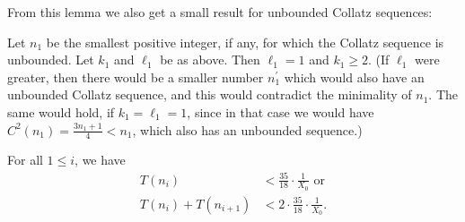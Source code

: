 \documentclass[12pt,reqno]{article}
\begin{document}
\begin{remark}
 From this lemma we also get a small result for unbounded Collatz sequences:
 
 Let $n_1$ be the smallest positive integer, if any, for which the Collatz sequence is unbounded. Let $k_1$ and $\ell_1$ be as above. Then $\ell_1=1$ and $k_1\geq 2$. (If $\ell_1$ were greater, then there would be a smaller number $n_1^{\prime}$ which would also have an unbounded Collatz sequence, and this would contradict the minimality of $n_1$. The same would hold, if $k_1=\ell_1=1$, since in that case we would have $C^2(n_1)=\tfrac{3n_1+1}{4}<n_1$, which also has an unbounded sequence.)
\end{remark}


\begin{lemma}\label{Lemma_T-Abschaetzung}
For all $1\leq i$, we have 
\begin{align*}
T(n_i)&< \frac{35}{18} \cdot \frac{1}{X_0} \text{ or}\\ 
T(n_i)+T(n_{i+1})&<2 \cdot \frac{35}{18} \cdot \frac{1}{X_0}.
\end{align*}  
\end{lemma}
\end{document}

